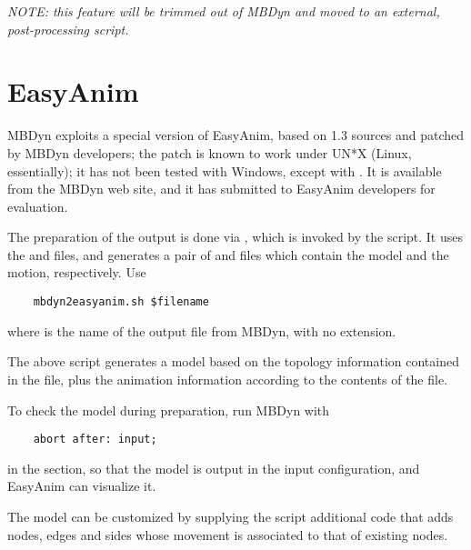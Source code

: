 \emph{NOTE: this feature will be trimmed out of MBDyn and moved
to an external, post-processing script.}



\section{EasyAnim}
MBDyn exploits a special version of EasyAnim, based on 1.3 sources
and patched by MBDyn developers; the patch is known to work under UN*X
(Linux, essentially); it has not been tested with Windows, except with
.
It is available from the MBDyn web site, and it has submitted to EasyAnim
developers for evaluation.

The preparation of the output is done via , which is invoked
by the  script.
It uses the  and  files, and generates a pair of
 and  files which contain the model and the motion,
respectively.
Use
\begin{verbatim}
    mbdyn2easyanim.sh $filename
\end{verbatim}
where  is the name of the output file from MBDyn,
with no extension.

The above script generates a model based on the topology information
contained in the  file, plus the animation information
according to the contents of the  file.

To check the model during preparation, run MBDyn with
\begin{verbatim}
    abort after: input;
\end{verbatim}
in the  section, so that the model is output 
in the input configuration, and EasyAnim can visualize it.

The model can be customized by supplying the 
script additional  code that adds nodes, edges and sides 
whose movement is associated to that of existing nodes.

